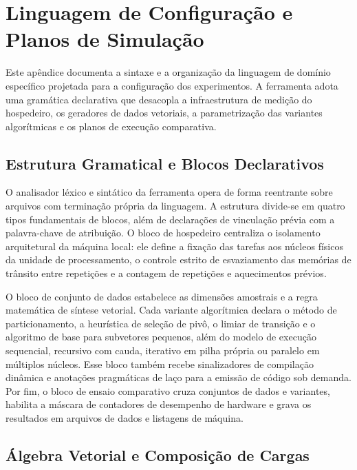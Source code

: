 \documentclass[12pt]{article}
\begin{document}
\clearpage
\section{Linguagem de Configuração e Planos de Simulação}\label{sec:apendice-dsl}

Este apêndice documenta a sintaxe e a organização da linguagem de domínio específico projetada para a configuração dos experimentos. A ferramenta adota uma gramática declarativa que desacopla a infraestrutura de medição do hospedeiro, os geradores de dados vetoriais, a parametrização das variantes algorítmicas e os planos de execução comparativa.

\subsection{Estrutura Gramatical e Blocos Declarativos}\label{sec:apendice-dsl-estrutura}

O analisador léxico e sintático da ferramenta opera de forma reentrante sobre arquivos com terminação própria da linguagem. A estrutura divide-se em quatro tipos fundamentais de blocos, além de declarações de vinculação prévia com a palavra-chave de atribuição. O bloco de hospedeiro centraliza o isolamento arquitetural da máquina local: ele define a fixação das tarefas aos núcleos físicos da unidade de processamento, o controle estrito de esvaziamento das memórias de trânsito entre repetições e a contagem de repetições e aquecimentos prévios.

O bloco de conjunto de dados estabelece as dimensões amostrais e a regra matemática de síntese vetorial. Cada variante algorítmica declara o método de particionamento, a heurística de seleção de pivô, o limiar de transição e o algoritmo de base para subvetores pequenos, além do modelo de execução sequencial, recursivo com cauda, iterativo em pilha própria ou paralelo em múltiplos núcleos. Esse bloco também recebe sinalizadores de compilação dinâmica e anotações pragmáticas de laço para a emissão de código sob demanda. Por fim, o bloco de ensaio comparativo cruza conjuntos de dados e variantes, habilita a máscara de contadores de desempenho de hardware e grava os resultados em arquivos de dados e listagens de máquina.

\subsection{Álgebra Vetorial e Composição de Cargas}\label{sec:apendice-dsl-algebra}
\end{document}
